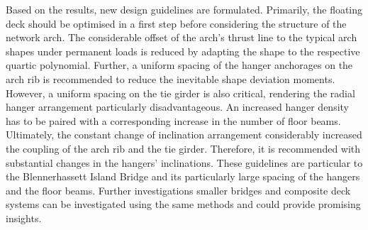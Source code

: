Based on the results, new design guidelines are formulated. Primarily, the floating deck should be optimised in a first step before considering the structure of the network arch. The considerable offset of the arch's thrust line to the typical arch shapes under permanent loads is reduced by adapting the shape to the respective quartic polynomial. Further, a uniform spacing of the hanger anchorages on the arch rib is recommended to reduce the inevitable shape deviation moments. However, a uniform spacing on the tie girder is also critical, rendering the radial hanger arrangement particularly disadvantageous. An increased hanger density has to be paired with a corresponding increase in the number of floor beams. Ultimately, the constant change of inclination arrangement considerably increased the coupling of the arch rib and the tie girder. Therefore, it is recommended with substantial changes in the hangers' inclinations. These guidelines are particular to the Blennerhassett Island Bridge and its particularly large spacing of the hangers and the floor beams. Further investigations smaller bridges and composite deck systems can be investigated using the same methods and could provide promising insights.
